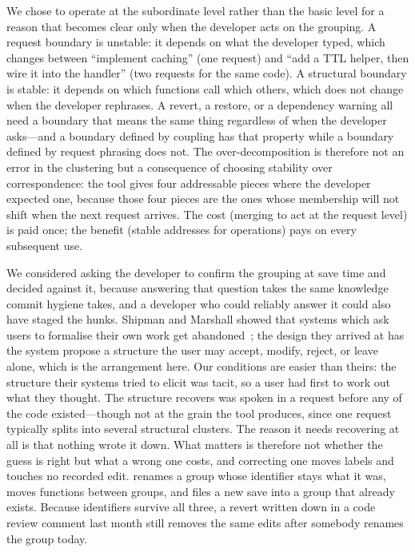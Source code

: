 We chose to operate at the subordinate level rather than the basic level for a
reason that becomes clear only when the developer acts on the grouping. A
request boundary is unstable: it depends on what the developer typed, which changes
between ``implement caching'' (one request) and ``add a TTL helper, then wire it
into the handler'' (two requests for the same code). A structural boundary is
stable: it depends on which functions call which others, which does not change when
the developer rephrases. A revert, a restore, or a dependency warning all need a
boundary that means the same thing regardless of when the developer asks---and a
boundary defined by coupling has that property while a boundary defined by request
phrasing does not. The over-decomposition is therefore not an error in the
clustering but a consequence of choosing stability over correspondence: the tool
gives four addressable pieces where the developer expected one, because those four
pieces are the ones whose membership will not shift when the next request arrives.
The cost (merging to act at the request level) is paid once; the benefit (stable
addresses for operations) pays on every subsequent use.

We considered asking the developer to confirm the grouping at save time and decided
against it, because answering that question takes the same knowledge commit hygiene
takes, and a developer who could reliably answer it could also have staged the
hunks. Shipman and Marshall showed that systems which ask users to formalise their
own work get abandoned~\cite{shipman1999}; the design they arrived at has the system
propose a structure the user may accept, modify, reject, or leave alone, which is
the arrangement here. Our conditions are easier than theirs: the structure their
systems tried to elicit was tacit, so a user had first to work out what they thought.
The structure \sgt{} recovers was spoken in a request before any of the code
existed---though not at the grain the tool produces, since one request typically
splits into several structural clusters. The reason it needs recovering at all
is that nothing wrote it down. What matters is therefore not whether the guess is
right but what a wrong one costs, and correcting one moves labels and touches no
recorded edit.  renames a group whose
identifier stays what it was,  moves functions between
groups, and  files a new save into a group that
already exists. Because identifiers survive all three, a revert written down in a
code review comment last month still removes the same edits after somebody renames
the group today.

